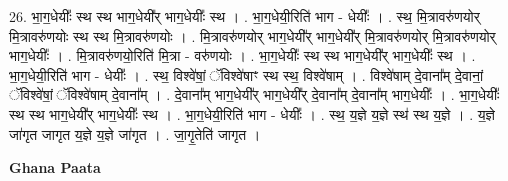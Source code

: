 \documentclass[17pt]{extarticle}
\begin{document}
26. भा॒ग॒धेयीः᳚ स्थ स्थ भाग॒धेयी᳚र् भाग॒धेयीः᳚ स्थ । . भा॒ग॒धेयी॒रिति॑ भाग - धेयीः᳚ । . स्थ॒ मि॒त्रावरु॑णयोर् मि॒त्रावरु॑णयोः स्थ स्थ मि॒त्रावरु॑णयोः । . मि॒त्रावरु॑णयोर् भाग॒धेयी᳚र् भाग॒धेयी᳚र् मि॒त्रावरु॑णयोर् मि॒त्रावरु॑णयोर् भाग॒धेयीः᳚ । . मि॒त्रावरु॑णयो॒रिति॑ मि॒त्रा - वरु॑णयोः । . भा॒ग॒धेयीः᳚ स्थ स्थ भाग॒धेयी᳚र् भाग॒धेयीः᳚ स्थ । . भा॒ग॒धेयी॒रिति॑ भाग - धेयीः᳚ । . स्थ॒ विश्वे॑षां॒ ॅविश्वे॑षाꣳ स्थ स्थ॒ विश्वे॑षाम् । . विश्वे॑षाम् दे॒वाना᳚म् दे॒वानां॒ ॅविश्वे॑षां॒ ॅविश्वे॑षाम् दे॒वाना᳚म् । . दे॒वाना᳚म् भाग॒धेयी᳚र् भाग॒धेयी᳚र् दे॒वाना᳚म् दे॒वाना᳚म् भाग॒धेयीः᳚ । . भा॒ग॒धेयीः᳚ स्थ स्थ भाग॒धेयी᳚र् भाग॒धेयीः᳚ स्थ । . भा॒ग॒धेयी॒रिति॑ भाग - धेयीः᳚ । . स्थ॒ य॒ज्ञे य॒ज्ञे स्थ॑ स्थ य॒ज्ञे । . य॒ज्ञे जा॑गृत जागृत य॒ज्ञे य॒ज्ञे जा॑गृत । . जा॒गृ॒तेति॑ जागृत । \newline

\textbf{Ghana Paata } \newline
\end{document}
